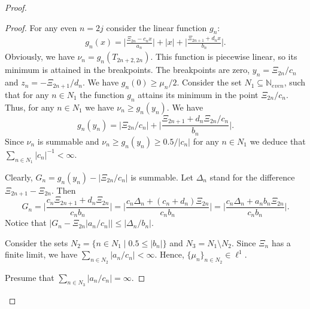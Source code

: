 \begin{proof}
\begin{proof}
        For any even $n = 2j$ consider the linear function $g_n$:
        \begin{align*}
          g_{n}(x) = \Big\lvert \frac{\Xi_{2n} - c_{n} x}{a_{n}} \Big\rvert +
                       \lvert x \rvert +
                     \Big\lvert \frac{\Xi_{2n+1} + d_{n} x}{b_{n}} \Big\rvert.
        \end{align*}
        Obviously, we have $\nu_{n} = g_{n}(T_{2n+2, 2n})$.
        This function is piecewise linear, so its minimum is attained in the breakpoints.
        The breakpoints are zero, $y_n = \Xi_{2n}/c_n$ and $z_n = -\Xi_{2n+1}/d_n$.
        We have $g_n(0) \geq \mu_n/2$.
        Consider the set $N_1 \subseteq \mathbb{N}_{{even}}$, such that for any $n \in N_1$ the function $g_n$ attains its minimum in
          the point $\Xi_{2n}/c_n$.
        Thus, for any $n\in N_1$ we have $\nu_n \geq g_n(y_n)$.
        We have
        \[
          g_n(y_n) = \Big\lvert \Xi_{2n}/c_n \Big\rvert +
                   \Big\lvert \frac{\Xi_{2n+1} + d_{n} \Xi_{2n}/c_n}{b_{n}} \Big\rvert.
        \]
        Since $\nu_n$ is summable and $\nu_n \geq g_n(y_n) \geq 0.5/|c_n|$ for any $n \in N_1$
          we deduce that $\sum_{n \in N_1} |c_n|^{-1} < \infty$.

        Clearly, $G_n = g_n(y_n) - \Big\lvert \Xi_{2n}/c_n \Big\rvert$ is summable.
        Let $\Delta_n$ stand for the difference $\Xi_{2n+1} - \Xi_{2n}$.
        Then
        \[
          G_n = \Big\lvert \frac{c_n \Xi_{2n+1} + d_{n} \Xi_{2n}}{c_n b_n} \Big\rvert
              = \Big\lvert \frac{c_n \Delta_n + (c_n + d_n) \Xi_{2n}}{c_n b_n} \Big\rvert
              = \Big\lvert \frac{c_n \Delta_n + a_n b_n\Xi_{2n}}{c_n b_n} \Big\rvert.
        \]
        Notice that $\big\lvert G_n - \Xi_{2n}\lvert a_n/c_n\rvert \big\rvert \leq \lvert \Delta_n/b_n \rvert$.

        Consider the sets $N_2 = \{n\in N_1 \mid 0.5 \leq \lvert b_n \rvert\}$ and $N_3 = N_1 \setminus N_2$.
        Since $\Xi_n$ has a finite limit, we have $\sum_{n \in N_2} \lvert a_n/c_n \rvert < \infty$.
        Hence, $\{\mu_n\}_{n \in N_2} \in \ell^1$.

        Presume that $\sum_{n \in N_3} \lvert a_n/c_n\rvert = \infty$.


\end{proof}
\end{proof}
